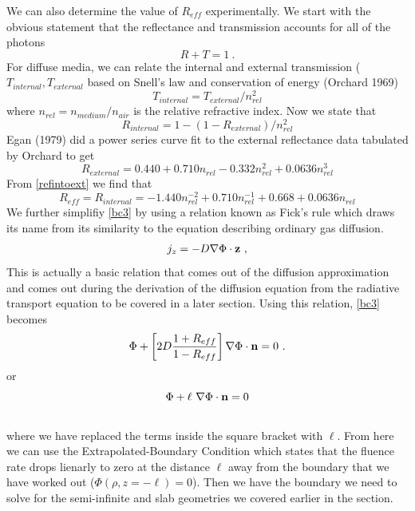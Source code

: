 We can also determine the value of $R_{eff}$ experimentally. We start with the obvious statement that the reflectance and transmission accounts for all of the photons
\begin{equation}
  R + T = 1 \ .
\end{equation}
For diffuse media, we can relate the internal and external transmission ($T_{internal}, T_{external}$ based on Snell's law and conservation of energy (Orchard 1969)
\begin{equation}
  T_{internal} = T_{external} /n_{rel}^2
\end{equation}
where $n_{rel} = n_{medium}/n_{air}$ is the relative refractive index. Now we state that
\begin{equation}
\label{refinttoext}
R_{internal} = 1 - (1 - R_{external})/n_{rel}^2
\end{equation}
Egan (1979) \cite{Egan1979} did a power series curve fit to the external reflectance data tabulated by Orchard \cite{Orchard1969} to get
\begin{equation}
R_{external} = 0.440 + 0.710n_{rel} -0.332n_{rel}^2 + 0.0636n_{rel}^3
\end{equation}
From \ref{refintoext} we find that \cite{Sevick2002}
\begin{equation}
\label{exp eff}
R_{eff} = R_{internal} = -1.440n_{rel}^{-2} + 0.710n_{rel}^{-1} + 0.668 + 0.0636n_{rel}
\end{equation}
\noindent
We further simplifiy \ref{bc3} by using a relation known as Fick's rule which draws its name from its similarity to the equation describing ordinary gas diffusion.
\begin{equation}
j_z = -D \nabla \Phi \cdot {\bf z} \ ,
\end{equation}
\noindent
This is actually a basic relation that comes out of the diffusion approximation and comes out during the derivation of the diffusion equation from the radiative transport equation \cite{Case1967} to be covered in a later section. Using this relation, \ref{bc3} becomes
\begin{equation}
\label{bc4}
\Phi + \left[2D \frac{1+R_{eff}}{1-R_{eff}}\right] \nabla \Phi \cdot {\bf n} = 0 \ .
\end{equation}
or
\begin{equation}
\label{BC_DE}
\Phi + \ell\ \nabla \Phi\cdot{\bf n} = 0
\end{equation}
\\
\noindent
where we have replaced the terms inside the square bracket with $\ell$. From here we can use the Extrapolated-Boundary Condition \cite{haskell_94_1,Aronson1993,Aronson1995} which states that the fluence rate drops lienarly to zero at the distance $\ell$ away from the boundary that we have worked out ($\Phi(\rho,z=-\ell) = 0$). Then we have the boundary we need to solve for the semi-infinite and slab geometries we covered earlier in the section.
